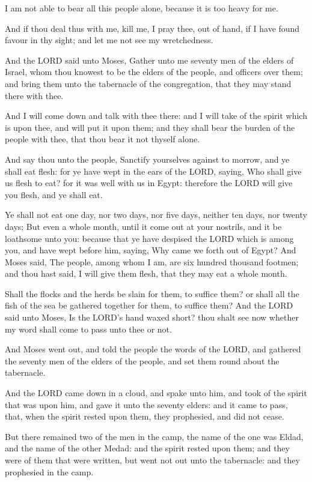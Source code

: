 \verse I am not able to bear all this people alone, because it is too
heavy for me.

\verse And if thou deal thus with me, kill me, I pray thee, out of
hand, if I have found favour in thy sight; and let me not see my
wretchedness.

\verse And the LORD said unto Moses, Gather unto me seventy men of the
elders of Israel, whom thou knowest to be the elders of the people,
and officers over them; and bring them unto the tabernacle of the
congregation, that they may stand there with thee.

\verse And I will come down and talk with thee there: and I will take
of the spirit which is upon thee, and will put it upon them; and they
shall bear the burden of the people with thee, that thou bear it not
thyself alone.

\verse And say thou unto the people, Sanctify yourselves against to
morrow, and ye shall eat flesh: for ye have wept in the ears of the
LORD, saying, Who shall give us flesh to eat? for it was well with us
in Egypt: therefore the LORD will give you flesh, and ye shall eat.

\verse Ye shall not eat one day, nor two days, nor five days, neither
ten days, nor twenty days; \verse But even a whole month, until it come
out at your nostrils, and it be loathsome unto you: because that ye
have despised the LORD which is among you, and have wept before him,
saying, Why came we forth out of Egypt?  \verse And Moses said, The
people, among whom I am, are six hundred thousand footmen; and thou
hast said, I will give them flesh, that they may eat a whole month.

\verse Shall the flocks and the herds be slain for them, to suffice
them?  or shall all the fish of the sea be gathered together for them,
to suffice them?  \verse And the LORD said unto Moses, Is the LORD's
hand waxed short? thou shalt see now whether my word shall come to
pass unto thee or not.

\verse And Moses went out, and told the people the words of the LORD,
and gathered the seventy men of the elders of the people, and set them
round about the tabernacle.

\verse And the LORD came down in a cloud, and spake unto him, and took
of the spirit that was upon him, and gave it unto the seventy elders:
and it came to pass, that, when the spirit rested upon them, they
prophesied, and did not cease.

\verse But there remained two of the men in the camp, the name of the
one was Eldad, and the name of the other Medad: and the spirit rested
upon them; and they were of them that were written, but went not out
unto the tabernacle: and they prophesied in the camp.

